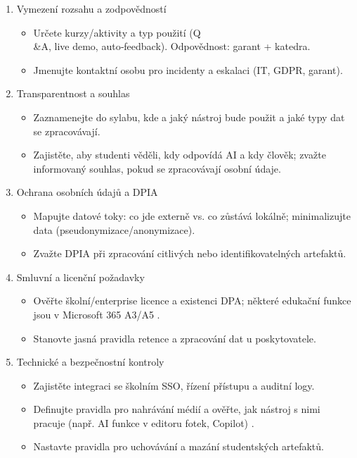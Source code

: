 \documentclass{report}%
\begin{document}
\begin{enumerate}
  \item Vymezení rozsahu a zodpovědností
    \begin{itemize}
      \item Určete kurzy/aktivity a typ použití (Q\\ \&A, live demo, auto‑feedback). Odpovědnost: garant + katedra.
      \item Jmenujte kontaktní osobu pro incidenty a eskalaci (IT, GDPR, garant).
    \end{itemize}

  \item Transparentnost a souhlas
    \begin{itemize}
      \item Zaznamenejte do sylabu, kde a jaký nástroj bude použit a jaké typy dat se zpracovávají.
      \item Zajistěte, aby studenti věděli, kdy odpovídá AI a kdy člověk; zvažte informovaný souhlas, pokud se zpracovávají osobní údaje.
    \end{itemize}

  \item Ochrana osobních údajů a DPIA
    \begin{itemize}
      \item Mapujte datové toky: co jde externě vs. co zůstává lokálně; minimalizujte data (pseudonymizace/anonymizace).
      \item Zvažte DPIA při zpracování citlivých nebo identifikovatelných artefaktů.
    \end{itemize}

  \item Smluvní a licenční požadavky
    \begin{itemize}
      \item Ověřte školní/enterprise licence a existenci DPA; některé edukační funkce jsou v Microsoft 365 A3/A5 \cite{kb_ai_101_tipu_pdf_04e4a115_page_15_2}.
      \item Stanovte jasná pravidla retence a zpracování dat u poskytovatele.
    \end{itemize}

  \item Technické a bezpečnostní kontroly
    \begin{itemize}
      \item Zajistěte integraci se školním SSO, řízení přístupu a auditní logy.
      \item Definujte pravidla pro nahrávání médií a ověřte, jak nástroj s nimi pracuje (např. AI funkce v editoru fotek, Copilot) \cite{kb_ai_101_tipu_pdf_04e4a115_page_53_1}.
      \item Nastavte pravidla pro uchovávání a mazání studentských artefaktů.
    \end{itemize}


\end{enumerate}
\end{document}
